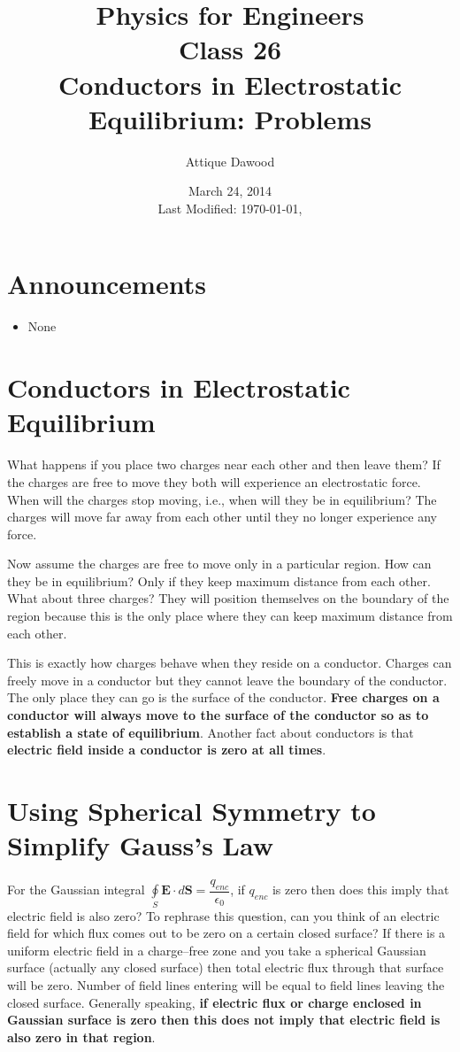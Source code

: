 \documentclass[12pt,a4paper]{article}
\title{\vspace{-3cm}Physics for Engineers\\Class 26\\Conductors in Electrostatic Equilibrium: Problems}
\author{Attique Dawood}
\date{March 24, 2014\\[0.2cm] Last Modified: \today, \currenttime}
\begin{document}
\maketitle
\section{Announcements}
\begin{itemize}
\item None
\end{itemize}
\section{Conductors in Electrostatic Equilibrium}
What happens if you place two charges near each other and then leave them? If the charges are free to move they both will experience an electrostatic force. When will the charges stop moving, i.e., when will they be in equilibrium? The charges will move far away from each other until they no longer experience any force.

Now assume the charges are free to move only in a particular region. How can they be in equilibrium? Only if they keep maximum distance from each other. What about three charges? They will position themselves on the boundary of the region because this is the only place where they can keep maximum distance from each other.

This is exactly how charges behave when they reside on a conductor. Charges can freely move in a conductor but they cannot leave the boundary of the conductor. The only place they can go is the surface of the conductor. \textbf{Free charges on a conductor will always move to the surface of the conductor so as to establish a state of equilibrium}. Another fact about conductors is that \textbf{electric field inside a conductor is zero at all times}.
\section{Using Spherical Symmetry to Simplify Gauss's Law}
For the Gaussian integral $\oint\limits_{S} \textbf{E}\cdot d\textbf{S}=\dfrac{q_{enc}}{\epsilon_0}$, if $q_{enc}$ is zero then does this imply that electric field is also zero? To rephrase this question, can you think of an electric field for which flux comes out to be zero on a certain closed surface? If there is a uniform electric field in a charge--free zone and you take a spherical Gaussian surface (actually any closed surface) then total electric flux through that surface will be zero. Number of field lines entering will be equal to field lines leaving the closed surface. Generally speaking, \textbf{if electric flux or charge enclosed in Gaussian surface is zero then this does not imply that electric field is also zero in that region}.
\end{document}
